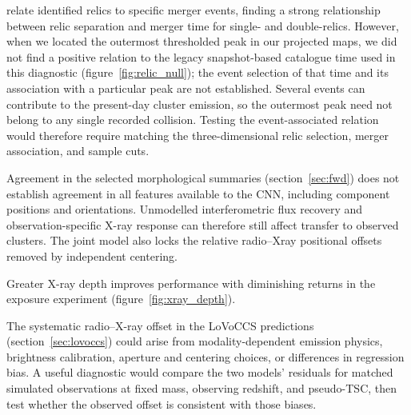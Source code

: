 \citet{Lee2025} relate identified relics to specific merger events, finding a strong relationship between relic separation and merger time for single- and double-relics.
However, when we located the outermost thresholded peak in our projected maps, we did not find a positive relation to the legacy snapshot-based catalogue time used in this diagnostic (figure~\ref{fig:relic_null}); the event selection of that time and its association with a particular peak are not established.
Several events can contribute to the present-day cluster emission, so the outermost peak need not belong to any single recorded collision.
Testing the event-associated relation would therefore require matching the \citet{Lee2025} three-dimensional relic selection, merger association, and sample cuts.

Agreement in the selected morphological summaries (section~\ref{sec:fwd}) does not establish agreement in all features available to the CNN, including component positions and orientations.
Unmodelled interferometric flux recovery and observation-specific X-ray response can therefore still affect transfer to observed clusters.
The joint model also locks the relative radio--Xray positional offsets removed by independent centering.

Greater X-ray depth improves performance with diminishing returns in the exposure experiment (figure~\ref{fig:xray_depth}).

The systematic radio--X-ray offset in the LoVoCCS predictions (section~\ref{sec:lovoccs}) could arise from modality-dependent emission physics, brightness calibration, aperture and centering choices, or differences in regression bias.
A useful diagnostic would compare the two models' residuals for matched simulated observations at fixed mass, observing redshift, and pseudo-TSC, then test whether the observed offset is consistent with those biases.

